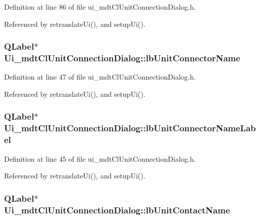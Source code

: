 Definition at line 86 of file ui\-\_\-mdt\-Cl\-Unit\-Connection\-Dialog.\-h.



Referenced by retranslate\-Ui(), and setup\-Ui().

\hypertarget{class_ui__mdt_cl_unit_connection_dialog_a576cf4a2577dde1712e3f465eda515b7}{
\subsubsection[{lb\-Unit\-Connector\-Name}]{\setlength{\rightskip}{0pt plus 5cm}Q\-Label$\ast$ Ui\-\_\-mdt\-Cl\-Unit\-Connection\-Dialog\-::lb\-Unit\-Connector\-Name}}\label{class_ui__mdt_cl_unit_connection_dialog_a576cf4a2577dde1712e3f465eda515b7}


Definition at line 47 of file ui\-\_\-mdt\-Cl\-Unit\-Connection\-Dialog.\-h.



Referenced by retranslate\-Ui(), and setup\-Ui().

\hypertarget{class_ui__mdt_cl_unit_connection_dialog_ae54eb8fe077d9ec14674dc160f0c64d8}{
\subsubsection[{lb\-Unit\-Connector\-Name\-Label}]{\setlength{\rightskip}{0pt plus 5cm}Q\-Label$\ast$ Ui\-\_\-mdt\-Cl\-Unit\-Connection\-Dialog\-::lb\-Unit\-Connector\-Name\-Label}}\label{class_ui__mdt_cl_unit_connection_dialog_ae54eb8fe077d9ec14674dc160f0c64d8}


Definition at line 45 of file ui\-\_\-mdt\-Cl\-Unit\-Connection\-Dialog.\-h.



Referenced by retranslate\-Ui(), and setup\-Ui().

\hypertarget{class_ui__mdt_cl_unit_connection_dialog_a407b18b7bfbd0b873ff30a57f97724f1}{
\subsubsection[{lb\-Unit\-Contact\-Name}]{\setlength{\rightskip}{0pt plus 5cm}Q\-Label$\ast$ Ui\-\_\-mdt\-Cl\-Unit\-Connection\-Dialog\-::lb\-Unit\-Contact\-Name}}\label{class_ui__mdt_cl_unit_connection_dialog_a407b18b7bfbd0b873ff30a57f97724f1}


